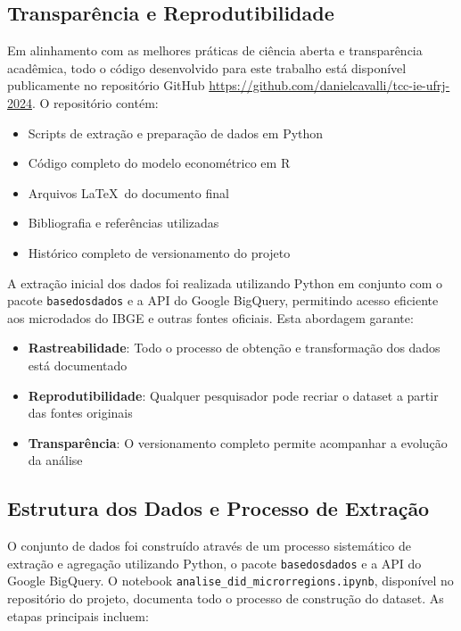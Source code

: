 \documentclass[
	12pt,				%
	oneside,			%
	a4paper,			%
	english,			%
	french,				%
	spanish,			%
	brazil				%
	]{abntex2}
\begin{document}
\subsection{Transparência e Reprodutibilidade}

Em alinhamento com as melhores práticas de ciência aberta e transparência acadêmica, todo o código desenvolvido para este trabalho está disponível publicamente no repositório GitHub \url{https://github.com/danielcavalli/tcc-ie-ufrj-2024}. O repositório contém:

\begin{itemize}
\item Scripts de extração e preparação de dados em Python
\item Código completo do modelo econométrico em R
\item Arquivos \LaTeX\ do documento final
\item Bibliografia e referências utilizadas
\item Histórico completo de versionamento do projeto
\end{itemize}

A extração inicial dos dados foi realizada utilizando Python em conjunto com o pacote \texttt{basedosdados} e a API do Google BigQuery, permitindo acesso eficiente aos microdados do IBGE e outras fontes oficiais. Esta abordagem garante:

\begin{itemize}
\item \textbf{Rastreabilidade}: Todo o processo de obtenção e transformação dos dados está documentado
\item \textbf{Reprodutibilidade}: Qualquer pesquisador pode recriar o dataset a partir das fontes originais
\item \textbf{Transparência}: O versionamento completo permite acompanhar a evolução da análise
\end{itemize}

\subsection{Estrutura dos Dados e Processo de Extração}

O conjunto de dados foi construído através de um processo sistemático de extração e agregação utilizando Python, o pacote \texttt{basedosdados} e a API do Google BigQuery. O notebook \texttt{analise\_did\_microrregions.ipynb}, disponível no repositório do projeto, documenta todo o processo de construção do dataset. As etapas principais incluem:
\end{document}
